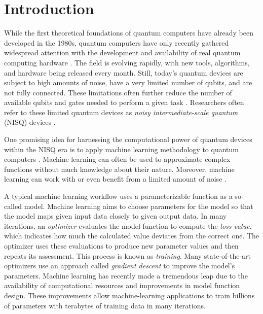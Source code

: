 \chapter{Introduction}
\label{chap:intro}

While the first theoretical foundations of quantum computers have already been
developed in the 1980s, quantum computers have only recently gathered widespread
attention with the development and availability of real quantum computing
hardware \cite{nielsen_quantum_2007,hidary_quantum_2021}.
The field is evolving rapidly, with new tools, algorithms, and hardware being
released every month.
Still, today's quantum devices are subject to high amounts of noise, have a very
limited number of qubits, and are not fully connected.
These limitations often further reduce the number of available qubits and gates
needed to perform a given task \cite{cerezo_variational_2021}.
Researchers often refer to these limited quantum devices as
\emph{noisy intermediate-scale quantum} (NISQ) devices
\cite{preskill_quantum_2018}.

One promising idea for harnessing the computational power of quantum devices
within the NISQ era is to apply machine learning methodology to quantum
computers \cite{cerezo_variational_2021}.
Machine learning can often be used to approximate complex functions without much
knowledge about their nature.
Moreover, machine learning can work with or even benefit from a limited amount
of noise \cite{ciliberto_quantum_2018}.

A typical machine learning workflow uses a parameterizable function as a
so-called model.
Machine learning aims to choose parameters for the model so that the model maps
given input data closely to given output data.
In many iterations, an \emph{optimizer} evaluates the model function to compute
the \emph{loss value}, which indicates how much the calculated value deviates
from the correct one.
The optimizer uses these evaluations to produce new parameter values and then
repeats its assessment.
This process is known as \emph{training}.
Many state-of-the-art optimizers use an approach called \emph{gradient descent}
to improve the model's parameters.
Machine learning has recently made a tremendous leap due to the availability of
computational resources and improvements in model function design.
These improvements allow machine-learning applications to train billions of
parameters with terabytes of training data in many iterations.

